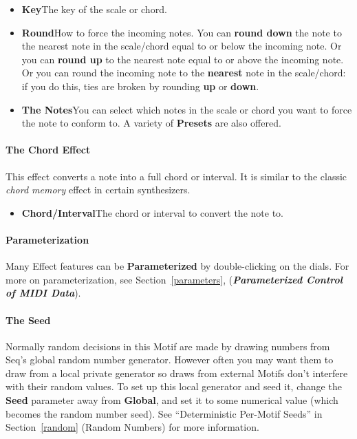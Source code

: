 \documentclass[twoside,10pt]{article}
\begin{document}
\begin{itemize}
\item {\bf Key}\qquad The key of the scale or chord.
\item {\bf Round}\qquad How to force the incoming notes. You can {\bf round down} the note to the nearest note in the scale/chord equal to or below the incoming note.  Or you can {\bf round up} to the nearest note equal to or above the incoming note.  Or you can round the incoming note to the {\bf nearest} note in the scale/chord: if you do this, ties are broken by rounding {\bf up} or {\bf down}.
\item {\bf The Notes}\qquad You can select which notes in the scale or chord you want to force the note to conform to.  A variety of {\bf Presets} are also offered.
\end{itemize}

\paragraph{The Chord Effect}

This effect converts a note into a full chord or interval.  It is similar to the classic {\it chord memory} effect in certain synthesizers.

\begin{itemize}
\item {\bf Chord/Interval}\qquad The chord or interval to convert the note to.
\end{itemize}



\paragraph{Parameterization}

Many Effect features can be {\bf Parameterized} by double-clicking on the dials.  For more on parameterization, see Section~\ref{parameters}, (\textbf{\textit{Parameterized Control of MIDI Data}}).

\paragraph{The Seed}

Normally random decisions in this Motif are made by drawing numbers from Seq's global random number generator.  However often you may want them to draw from a local private generator so draws from external Motifs don't interfere with their random values.  To set up this local generator and seed it, change the {\bf Seed} parameter away from {\bf Global}, and set it to some numerical value (which becomes the random number seed).  See ``Deterministic Per-Motif Seeds'' in Section~\ref{random} (Random Numbers) for more information.
\end{document}
